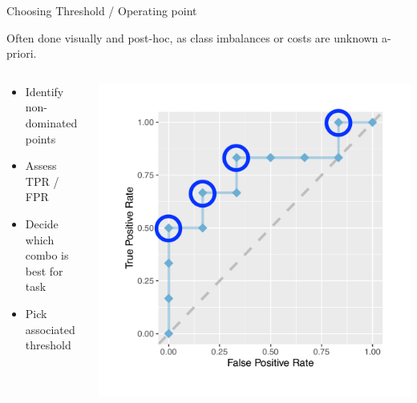 \documentclass[11pt,compress,t,notes=noshow, xcolor=table]{beamer}
\begin{document}
\begin{vbframe}{Choosing Threshold / Operating point}

Often done visually and post-hoc, as class imbalances or costs are unknown a-priori.

\lz

\begin{columns}
\begin{column}{0.6\textwidth}
\begin{itemize}
  \item Identify non-dominated points 
  \item Assess TPR / FPR 
  \item Decide which combo is best for task
  \item Pick associated threshold
\end{itemize}
\end{column}

\begin{column}{0.4\textwidth}
\begin{center}
  \includegraphics[width=\textwidth,trim={1.5cm 0 0 1.5cm},clip]{figure/eval_mclass_roc_sp_4a.pdf}
\end{center}
\end{column}
\end{columns}
\end{vbframe}
\end{document}
